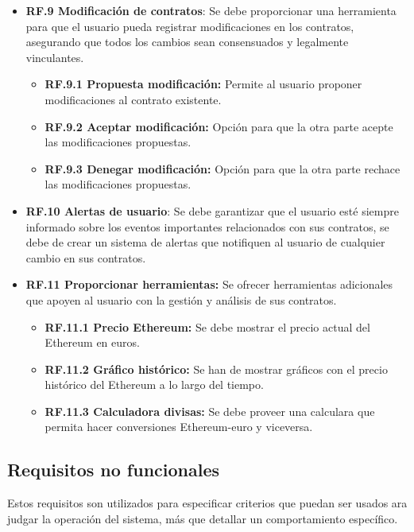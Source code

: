 \begin{itemize}
\item \textbf{RF.9 Modificación de contratos}: Se debe proporcionar una herramienta para que el usuario pueda registrar modificaciones en los contratos, asegurando que todos los cambios sean consensuados y legalmente vinculantes.
	\begin{itemize}
	\item \textbf{RF.9.1 Propuesta modificación:} Permite al usuario proponer modificaciones al			contrato existente.
	\item \textbf{RF.9.2 Aceptar modificación:} Opción para que la otra parte acepte las					modificaciones propuestas.
	\item \textbf{RF.9.3 Denegar modificación:} Opción para que la otra parte rechace las					modificaciones propuestas.
	\end{itemize}
	
\item \textbf{RF.10 Alertas de usuario}: Se debe garantizar que el usuario esté siempre informado sobre los eventos importantes relacionados con sus contratos, se debe de crear un sistema de alertas que notifiquen al usuario de cualquier cambio en sus contratos.
	
\item \textbf{RF.11 Proporcionar herramientas:} Se ofrecer herramientas adicionales que apoyen al usuario con la gestión y análisis de sus contratos.
	\begin{itemize}
	\item \textbf{RF.11.1 Precio Ethereum:} Se debe mostrar el precio actual del Ethereum en euros.
	\item \textbf{RF.11.2 Gráfico histórico:} Se han de mostrar gráficos con el precio histórico del		Ethereum a lo largo del tiempo.
	\item \textbf{RF.11.3 Calculadora divisas:} Se debe proveer una calculara que permita hacer 			conversiones Ethereum-euro y viceversa.
	\end{itemize}

\end{itemize}


\subsection{Requisitos no funcionales}

Estos requisitos son utilizados para especificar criterios que puedan ser usados ara judgar la operación del sistema, más que detallar un comportamiento específico.


